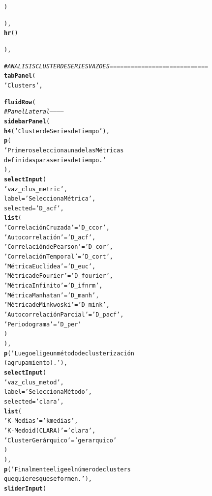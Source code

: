 \documentclass[12pt,oneside]{book}\usepackage[]{graphicx}\usepackage[]{color}
\makeatletter
\newcommand{\hlstr}[1]{\textcolor[rgb]{0.192,0.494,0.8}{#1}}%
\newcommand{\hlcom}[1]{\textcolor[rgb]{0.678,0.584,0.686}{\textit{#1}}}%
\newcommand{\hlstd}[1]{\textcolor[rgb]{0.345,0.345,0.345}{#1}}%
\newcommand{\hlkwc}[1]{\textcolor[rgb]{0.333,0.667,0.333}{#1}}%
\newcommand{\hlkwd}[1]{\textcolor[rgb]{0.737,0.353,0.396}{\textbf{#1}}}%
\newenvironment{kframe}{%
 \def\at@end@of@kframe{}%
 \ifinner\ifhmode%
  \def\at@end@of@kframe{\end{minipage}}%
  \begin{minipage}{\columnwidth}%
 \fi\fi%
 \def\FrameCommand##1{\hskip\@totalleftmargin \hskip-\fboxsep
 \colorbox{shadecolor}{##1}\hskip-\fboxsep
     \hskip-\linewidth \hskip-\@totalleftmargin \hskip\columnwidth}%
 \MakeFramed {\advance\hsize-\width
   \@totalleftmargin\z@ \linewidth\hsize
   \@setminipage}}%
 {\par\unskip\endMakeFramed%
 \at@end@of@kframe}
\newenvironment{knitrout}{}{} %
\theoremstyle{definition} %
\makeatother
\begin{document}
\begin{knitrout}
\begin{kframe}
\begin{alltt}
          \hlstd{)}

        \hlstd{),}
    \hlkwd{hr}\hlstd{()}


        \hlstd{),}

  \hlcom{# ANALISIS CLUSTER DE SERIES VAZOES ============================}
  \hlkwd{tabPanel}\hlstd{(}
    \hlstr{'Clusters'}\hlstd{,}

    \hlkwd{fluidRow}\hlstd{(}
      \hlcom{# Panel Lateral  -----------}
      \hlkwd{sidebarPanel}\hlstd{(}
        \hlkwd{h4}\hlstd{(}\hlstr{'Cluster de Series de Tiempo'}\hlstd{),}
        \hlkwd{p}\hlstd{(}
          \hlstr{'Primero selecciona una de las Métricas
          definidas para series de tiempo.'}
        \hlstd{),}
        \hlkwd{selectInput}\hlstd{(}
          \hlstr{'vaz_clus_metric'}\hlstd{,}
          \hlkwc{label} \hlstd{=} \hlstr{'Selecciona Métrica'}\hlstd{,}
          \hlkwc{selected} \hlstd{=} \hlstr{'D_acf'}\hlstd{,}
          \hlkwd{list}\hlstd{(}
            \hlstr{'Correlación Cruzada'} \hlstd{=} \hlstr{'D_ccor'}\hlstd{,}
            \hlstr{'Autocorrelación'} \hlstd{=} \hlstr{'D_acf'}\hlstd{,}
            \hlstr{'Correlación de Pearson'} \hlstd{=} \hlstr{'D_cor'}\hlstd{,}
            \hlstr{'Correlación Temporal'} \hlstd{=} \hlstr{'D_cort'}\hlstd{,}
            \hlstr{'Métrica Euclidea'} \hlstd{=} \hlstr{'D_euc'}\hlstd{,}
            \hlstr{'Métrica de Fourier'} \hlstd{=} \hlstr{'D_fourier'}\hlstd{,}
            \hlstr{'Métrica Infinito'} \hlstd{=} \hlstr{'D_ifnrm'}\hlstd{,}
            \hlstr{'Métrica Manhatan'} \hlstd{=} \hlstr{'D_manh'}\hlstd{,}
            \hlstr{'Métrica de Minkwoski'} \hlstd{=} \hlstr{'D_mink'}\hlstd{,}
            \hlstr{'Autocorrelación Parcial'} \hlstd{=} \hlstr{'D_pacf'}\hlstd{,}
            \hlstr{'Periodograma'} \hlstd{=} \hlstr{'D_per'}
          \hlstd{)}
        \hlstd{),}
        \hlkwd{p}\hlstd{(}\hlstr{'Luego elige un método de clusterización
          (agrupamiento).'}\hlstd{),}
        \hlkwd{selectInput}\hlstd{(}
          \hlstr{'vaz_clus_metod'}\hlstd{,}
          \hlkwc{label} \hlstd{=} \hlstr{'Selecciona Método'}\hlstd{,}
          \hlkwc{selected} \hlstd{=} \hlstr{'clara'}\hlstd{,}
          \hlkwd{list}\hlstd{(}
            \hlstr{'K-Medias'} \hlstd{=} \hlstr{'kmedias'}\hlstd{,}
            \hlstr{'K-Medoid (CLARA)'} \hlstd{=} \hlstr{'clara'}\hlstd{,}
            \hlstr{'Cluster Gerárquico'} \hlstd{=} \hlstr{'gerarquico'}
          \hlstd{)}
        \hlstd{),}
        \hlkwd{p}\hlstd{(}\hlstr{'Finalmente elige el número de clusters
          que quieres que se formen.'}\hlstd{),}
        \hlkwd{sliderInput}\hlstd{(}

\end{alltt}
\end{kframe}
\end{knitrout}
\end{document}
